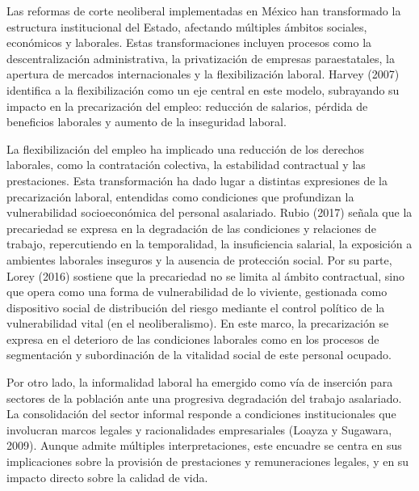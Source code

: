 \documentclass[
  spanish,
  11.5pt,
  170mm x 240mmpaper,
]{scrbook}
\begin{document}
Las reformas de corte neoliberal implementadas en México han
transformado la estructura institucional del Estado, afectando múltiples
ámbitos sociales, económicos y laborales. Estas transformaciones
incluyen procesos como la descentralización administrativa, la
privatización de empresas paraestatales, la apertura de mercados
internacionales y la flexibilización laboral. Harvey (2007) identifica a
la flexibilización como un eje central en este modelo, subrayando su
impacto en la precarización del empleo: reducción de salarios, pérdida
de beneficios laborales y aumento de la inseguridad laboral.

La flexibilización del empleo ha implicado una reducción de los derechos
laborales, como la contratación colectiva, la estabilidad contractual y
las prestaciones. Esta transformación ha dado lugar a distintas
expresiones de la precarización laboral, entendidas como condiciones que
profundizan la vulnerabilidad socioeconómica del personal asalariado.
Rubio (2017) señala que la precariedad se expresa en la degradación de
las condiciones y relaciones de trabajo, repercutiendo en la
temporalidad, la insuficiencia salarial, la exposición a ambientes
laborales inseguros y la ausencia de protección social. Por su parte,
Lorey (2016) sostiene que la precariedad no se limita al ámbito
contractual, sino que opera como una forma de vulnerabilidad de lo
viviente, gestionada como dispositivo social de distribución del riesgo
mediante el control político de la vulnerabilidad vital (en el
neoliberalismo). En este marco, la precarización se expresa en el
deterioro de las condiciones laborales como en los procesos de
segmentación y subordinación de la vitalidad social de este personal
ocupado.

Por otro lado, la informalidad laboral ha emergido como vía de inserción
para sectores de la población ante una progresiva degradación del
trabajo asalariado. La consolidación del sector informal responde a
condiciones institucionales que involucran marcos legales y
racionalidades empresariales (Loayza y Sugawara, 2009). Aunque admite
múltiples interpretaciones, este encuadre se centra en sus implicaciones
sobre la provisión de prestaciones y remuneraciones legales, y en su
impacto directo sobre la calidad de vida.
\end{document}
